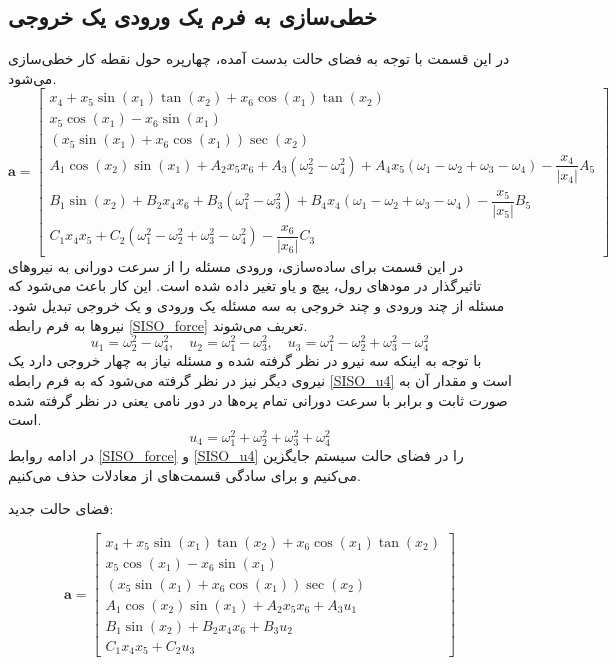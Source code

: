 \subsection{خطی‌سازی به فرم یک ورودی یک خروجی}\label{lin_SISO}
در این قسمت با توجه به فضای حالت بدست آمده، چهارپره حول نقطه کار خطی‌سازی می‌شود.
\begin{equation*}
	\boldsymbol a = \begin{bmatrix}
		x_4 + x_5\sin(x_1)\tan(x_2) + x_6\cos(x_1)\tan(x_2)\\
		x_5\cos(x_1)- x_6\sin(x_1)\\
		(x_5\sin(x_1) + x_6\cos(x_1))\sec(x_2)\\
		A_1\cos(x_2)\sin(x_1) + 
		A_2x_5x_6 + A_3\left(\omega_2^2-\omega_4^2\right)+
		A_4x_5\left(\omega_1-\omega_2+\omega_3-\omega_4\right)- \dfrac{x_4}{\lvert x_4\rvert}A_5\\
		B_1\sin(x_2) + 
		B_2x_4x_6 + B_3\left(\omega_1^2-\omega_3^2\right)+
		B_4x_4\left(\omega_1-\omega_2+\omega_3-\omega_4\right)- \dfrac{x_5}{\lvert x_5\rvert}B_5\\
		C_1x_4x_5 + 
		C_2\left(\omega_1^2-\omega_2^2+\omega_3^2-\omega_4^2\right)- \dfrac{x_6}{\lvert x_6\rvert}C_3
	\end{bmatrix}
\end{equation*} 
در این قسمت برای ساده‌سازی، ورودی مسئله را از سرعت دورانی به نیروهای تاثیرگذار در مودهای رول، پیچ و یاو تغیر داده شده است. این کار باعث می‌شود که مسئله از چند ورودی و چند خروجی به سه مسئله یک ورودی و یک خروجی تبدیل شود. نیروها به فرم رابطه 
\ref{SISO_force}
تعریف می‌شوند.
\begin{equation}\label{SISO_force}
	u_1 = \omega_2^2 - \omega_4^2, \quad
	u_2 = \omega_1^2 - \omega_3^2, \quad
	u_3 = \omega_1^2 - \omega_2^2  + \omega_3^2 - \omega_4^2
\end{equation}
با توجه به اینکه سه نیرو در نظر گرفته ‌شده و مسئله نیاز به چهار خروجی دارد یک نیروی دیگر نیز در نظر گرفته ‌می‌شود که به فرم رابطه 
\ref{SISO_u4}
است و مقدار آن به صورت ثابت و برابر با سرعت دورانی تمام پره‌ها در دور نامی یعنی
در نظر گرفته ‌شده ‌است.
\begin{equation}\label{SISO_u4}
	u_4 = \omega_1^2 + \omega_2^2  + \omega_3^2 + \omega_4^2
\end{equation}
در ادامه روابط 
\ref{SISO_force}
و
\ref{SISO_u4}
را در فضای حالت سیستم جایگزین می‌کنیم و برای سادگی قسمت‌های 
از معادلات حذف می‌کنیم.

فضای حالت جدید:

\begin{equation}
	\boldsymbol a = \begin{bmatrix}
		x_4 + x_5\sin(x_1)\tan(x_2) + x_6\cos(x_1)\tan(x_2)\\
		x_5\cos(x_1)- x_6\sin(x_1)\\
		(x_5\sin(x_1) + x_6\cos(x_1))\sec(x_2)\\
		A_1\cos(x_2)\sin(x_1) + 
		A_2x_5x_6 + A_3u_1
		\\
		B_1\sin(x_2) + 
		B_2x_4x_6 + B_3u_2\\
		C_1x_4x_5 + 
		C_2u_3
	\end{bmatrix}
\end{equation} 

